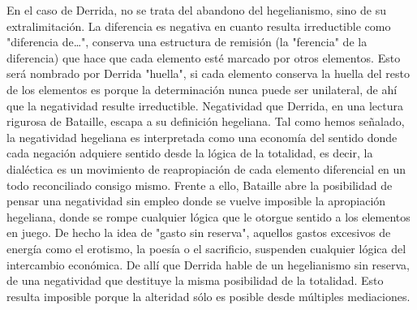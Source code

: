 \documentclass{book}
\begin{document}
En el caso de Derrida, no se trata del abandono del hegelianismo, sino
de su extralimitación. La diferencia es negativa en cuanto resulta
irreductible como "diferencia de\ldots", conserva una estructura de
remisión (la "ferencia" de la diferencia) que hace que cada elemento
esté marcado por otros elementos. Esto será nombrado por Derrida
"huella", si cada elemento conserva la huella del resto de los elementos
es porque la determinación nunca puede ser unilateral, de ahí que la
negatividad resulte irreductible. Negatividad que Derrida, en una
lectura rigurosa de Bataille, escapa a su definición hegeliana. Tal como
hemos señalado, la negatividad hegeliana es interpretada como una
economía del sentido donde cada negación adquiere sentido desde la
lógica de la totalidad, es decir, la dialéctica es un movimiento de
reapropiación de cada elemento diferencial en un todo reconciliado
consigo mismo. Frente a ello, Bataille abre la posibilidad de pensar una
negatividad sin empleo donde se vuelve imposible la apropiación
hegeliana, donde se rompe cualquier lógica que le otorgue sentido a los
elementos en juego. De hecho la idea de "gasto sin reserva", aquellos
gastos excesivos de energía como el erotismo, la poesía o el sacrificio,
suspenden cualquier lógica del intercambio económica. De allí que
Derrida hable de un hegelianismo sin reserva, de una negatividad que
destituye la misma posibilidad de la totalidad. Esto resulta imposible
porque la alteridad sólo es posible desde múltiples mediaciones.
\end{document}
